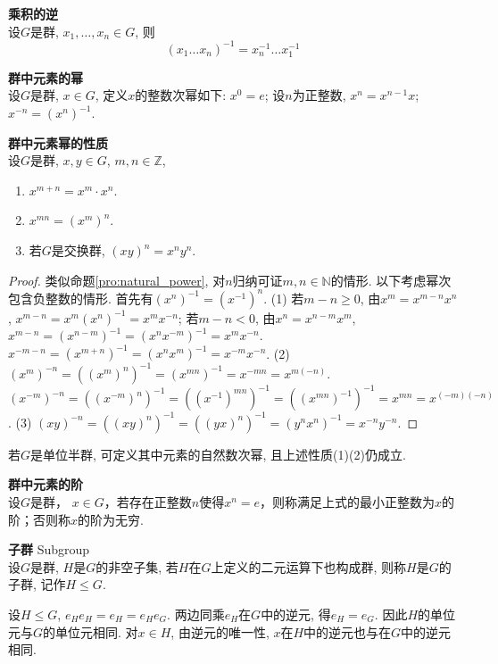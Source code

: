 \begin{pro}
\textbf{乘积的逆}\\
设$G$是群, $x_1,\dots,x_n\in G$, 则
\begin{equation}
    (x_1\dots x_n)^{-1}=x_n^{-1}\dots x_1^{-1}
\end{equation}
\end{pro}

\begin{dfn} \textbf{群中元素的幂}\\
设$G$是群, $x\in G$, 定义$x$的整数次幂如下:
$x^0=e$; 设$n$为正整数, $x^n=x^{n-1}x$; $x^{-n}=(x^n)^{-1}$.
\end{dfn}

\begin{pro} \textbf{群中元素幂的性质}\\
设$G$是群, $x,y\in G$, $m,n\in \mathbb{Z}$, 
\begin{enumerate}
\item $x^{m+n}=x^m\cdot x^n$.
\item $x^{mn}=(x^m)^n$.
\item 若$G$是交换群, $(xy)^n = x^ny^n$.
\end{enumerate}
\end{pro}
\begin{proof}
类似命题\ref{pro:natural_power}, 对$n$归纳可证$m,n\in \mathbb{N}$的情形. 以下考虑幂次包含负整数的情形. 首先有$(x^n)^{-1}=(x^{-1})^n$. 
(1) 若$m-n\ge 0$, 由$x^m=x^{m-n}x^n$, $x^{m-n}=x^m (x^{n})^{-1}=x^mx^{-n}$; 若$m-n<0$, 由$x^n=x^{n-m}x^m$, $x^{m-n}=(x^{n-m})^{-1}=(x^nx^{-m})^{-1}=x^mx^{-n}$. $x^{-m-n}=(x^{m+n})^{-1}=(x^nx^m)^{-1}=x^{-m}x^{-n}$. 
(2) $(x^m)^{-n}=((x^m)^n)^{-1}=(x^{mn})^{-1}=x^{-mn}=x^{m(-n)}$.
$(x^{-m})^{-n}=((x^{-m})^n)^{-1}=((x^{-1})^{mn})^{-1}=((x^{mn})^{-1})^{-1}=x^{mn}=x^{(-m)(-n)}$.
(3) $(xy)^{-n}=((xy)^n)^{-1}=((yx)^n)^{-1}=(y^nx^n)^{-1}=x^{-n}y^{-n}$.
\end{proof}

\par 若$G$是单位半群, 可定义其中元素的自然数次幂, 且上述性质(1)(2)仍成立. 

\begin{dfn} \textbf{群中元素的阶}\\
设$G$是群， $x\in G$，若存在正整数$n$使得$x^n=e$，则称满足上式的最小正整数为$x$的阶；否则称$x$的阶为无穷.
\end{dfn}

\begin{dfn} \textbf{子群} Subgroup\\
设$G$是群, $H$是$G$的非空子集, 若$H$在$G$上定义的二元运算下也构成群, 则称$H$是$G$的子群, 记作$H\le G$.
\end{dfn}
设$H\le G$, $e_He_H=e_H=e_He_G$. 两边同乘$e_H$在$G$中的逆元, 得$e_H=e_G$. 因此$H$的单位元与$G$的单位元相同. 对$x\in H$, 由逆元的唯一性, $x$在$H$中的逆元也与在$G$中的逆元相同. 

